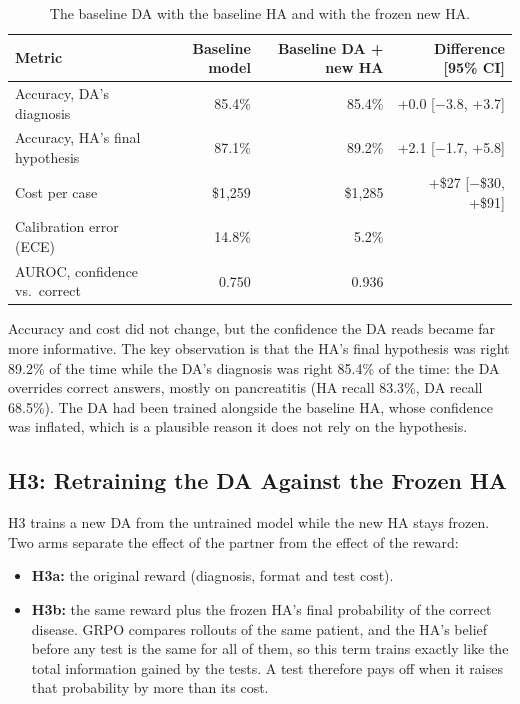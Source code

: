 \documentclass[11pt]{article}
\begin{document}
\begin{table}[ht]
  \centering
  \caption{The baseline DA with the baseline HA and with the frozen new HA.}
  \label{tab:step2}
  \small
  \begin{tabular}{lrrr}
    \toprule
    Metric & Baseline model & Baseline DA + new HA & Difference [95\% CI] \\
    \midrule
    Accuracy, DA's diagnosis & 85.4\% & 85.4\% & +0.0 [$-$3.8, +3.7] \\
    Accuracy, HA's final hypothesis & 87.1\% & 89.2\% & +2.1 [$-$1.7, +5.8] \\
    Cost per case & \$1,259 & \$1,285 & +\$27 [$-$\$30, +\$91] \\
    Calibration error (ECE) & 14.8\% & 5.2\% & \\
    AUROC, confidence vs.\ correct & 0.750 & 0.936 & \\
    \bottomrule
  \end{tabular}
\end{table}

Accuracy and cost did not change, but the confidence the DA reads became far
more informative. The key observation is that the HA's final hypothesis was
right 89.2\% of the time while the DA's diagnosis was right 85.4\% of the time:
the DA overrides correct answers, mostly on pancreatitis (HA recall 83.3\%,
DA recall 68.5\%). The DA had been trained alongside the baseline HA, whose confidence was
inflated, which is a plausible reason it does not rely on the hypothesis.

\subsection*{H3: Retraining the DA Against the Frozen HA}

H3 trains a new DA from the untrained model while the new HA stays frozen. Two arms
separate the effect of the partner from the effect of the reward:

\begin{itemize}
  \item \textbf{H3a:} the original reward (diagnosis, format and test cost).
  \item \textbf{H3b:} the same reward plus the frozen HA's final probability of
        the correct disease. GRPO compares rollouts of the same patient, and
        the HA's belief before any test is the same for all of them, so this
        term trains exactly like the total information gained by the tests. A
        test therefore pays off when it raises that probability by more than
        its cost.
\end{itemize}
\end{document}
